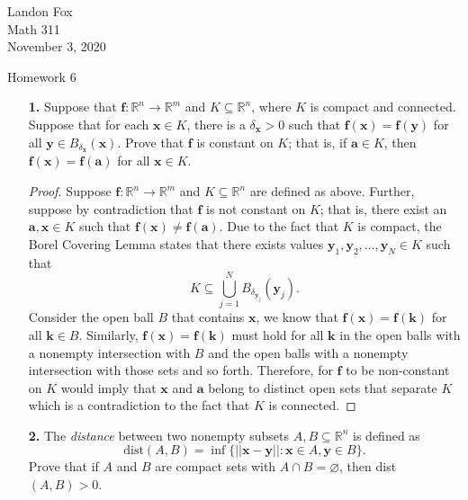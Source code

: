 \documentclass[ 12pt ]{article}
\begin{document}
\noindent Landon Fox \\
\noindent Math 311 \\
\noindent November 3, 2020

\begin{center}
	\Large Homework 6
\end{center}

\begin{enumerate}
	\item[\textbf{1.}] Suppose that $\textbf{f}: \mathbb{R}^n \to \mathbb{R}^m$ and $K \subseteq \mathbb{R}^n$, where $K$ is compact and connected. Suppose that for each $\textbf{x} \in
		K$, there is a $\delta_\textbf{x} > 0$ such that $\textbf{f}(\textbf{x}) = \textbf{f}(\textbf{y})$ for all $\textbf{y} \in B_{\delta_\textbf{x}}(\textbf{x})$. Prove that
		$\textbf{f}$ is constant on $K$; that is, if $\textbf{a} \in K$, then $\textbf{f}(\textbf{x}) = \textbf{f}(\textbf{a})$ for all $\textbf{x} \in K$.

		\begin{proof}
			Suppose $\textbf{f} : \mathbb{R}^n \to \mathbb{R}^m$ and $K \subseteq \mathbb{R}^n$ are defined as above. Further, suppose by contradiction that $\textbf{f}$ is not constant
			on $K$; that is, there exist an $\textbf{a}, \textbf{x} \in K$ such that $\textbf{f}(\textbf{x}) \neq \textbf{f}(\textbf{a})$. Due to the fact that $K$ is compact, the
			Borel Covering Lemma states that there exists values $\textbf{y}_1, \textbf{y}_2, \hdots, \textbf{y}_N \in K$ such that $$K \subseteq \bigcup_{j = 1}^N
			B_{\delta_{\textbf{y}_j}} (\textbf{y}_j).$$ Consider the open ball $B$ that contains $\textbf{x}$, we know that $\textbf{f}(\textbf{x}) = \textbf{f}(\textbf{k})$ for all
			$\textbf{k} \in B$. Similarly, $\textbf{f}(\textbf{x}) = \textbf{f}(\textbf{k})$ must hold for all $\textbf{k}$ in the open balls with a nonempty intersection with $B$ and
			the open balls with a nonempty intersection with those sets and so forth. Therefore, for $\textbf{f}$ to be non-constant on $K$ would imply that $\textbf{x}$ and
			$\textbf{a}$ belong to distinct open sets that separate $K$ which is a contradiction to the fact that $K$ is connected.
		\end{proof}


	\item[\textbf{2.}] The \textit{distance} between two nonempty subsets $A, B \subseteq \mathbb{R}^n$ is defined as $$\mathrm{dist}(A, B) = \inf \{ || \textbf{x} - \textbf{y} ||:
		\textbf{x} \in A, \textbf{y} \in B \}.$$ Prove that if $A$ and $B$ are compact sets with $A \cap B = \varnothing$, then dist$(A, B) > 0$.


\end{enumerate}
\end{document}

